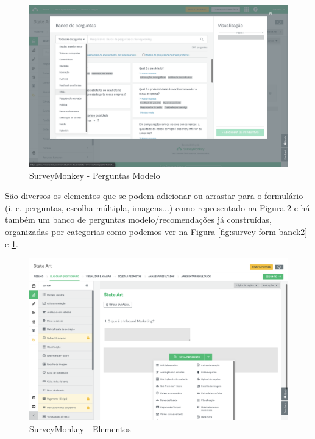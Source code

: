 \begin{figure}[ht!]
	\begin{center}
		\includegraphics[width=1\textwidth]{img/sm/survey-form-bank1}
		\caption{SurveyMonkey - Perguntas Modelo }
		\label{fig:survey-form-banck1}
	\end{center}
\end{figure}

\newpage

São diversos os elementos que se podem adicionar ou arrastar para o formulário (i. e. perguntas, escolha múltipla, imagens...) como representado na Figura \ref{fig:surveymonkey-form-element} e há também um banco de perguntas modelo/recomendações já construídas, organizadas por categorias como podemos ver na Figura \ref{fig:survey-form-banck2} e \ref{fig:survey-form-banck1}.


\begin{figure}[ht!]
	\begin{center}
		\includegraphics[width=1\textwidth]{img/sm/surveymonkey-form-element}
		\caption{SurveyMonkey - Elementos }
		\label{fig:surveymonkey-form-element}
	\end{center}
\end{figure}
\newpage

